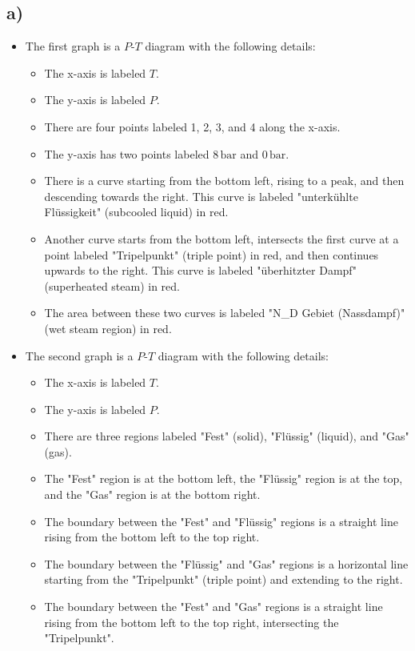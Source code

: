 

\subsection*{a)}

\begin{itemize}
    \item The first graph is a $P$-$T$ diagram with the following details:
    \begin{itemize}
        \item The x-axis is labeled $T$.
        \item The y-axis is labeled $P$.
        \item There are four points labeled 1, 2, 3, and 4 along the x-axis.
        \item The y-axis has two points labeled $8 \, \text{bar}$ and $0 \, \text{bar}$.
        \item There is a curve starting from the bottom left, rising to a peak, and then descending towards the right. This curve is labeled "unterkühlte Flüssigkeit" (subcooled liquid) in red.
        \item Another curve starts from the bottom left, intersects the first curve at a point labeled "Tripelpunkt" (triple point) in red, and then continues upwards to the right. This curve is labeled "überhitzter Dampf" (superheated steam) in red.
        \item The area between these two curves is labeled "N\_D Gebiet (Nassdampf)" (wet steam region) in red.
    \end{itemize}
    
    \item The second graph is a $P$-$T$ diagram with the following details:
    \begin{itemize}
        \item The x-axis is labeled $T$.
        \item The y-axis is labeled $P$.
        \item There are three regions labeled "Fest" (solid), "Flüssig" (liquid), and "Gas" (gas).
        \item The "Fest" region is at the bottom left, the "Flüssig" region is at the top, and the "Gas" region is at the bottom right.
        \item The boundary between the "Fest" and "Flüssig" regions is a straight line rising from the bottom left to the top right.
        \item The boundary between the "Flüssig" and "Gas" regions is a horizontal line starting from the "Tripelpunkt" (triple point) and extending to the right.
        \item The boundary between the "Fest" and "Gas" regions is a straight line rising from the bottom left to the top right, intersecting the "Tripelpunkt".
    \end{itemize}
\end{itemize}